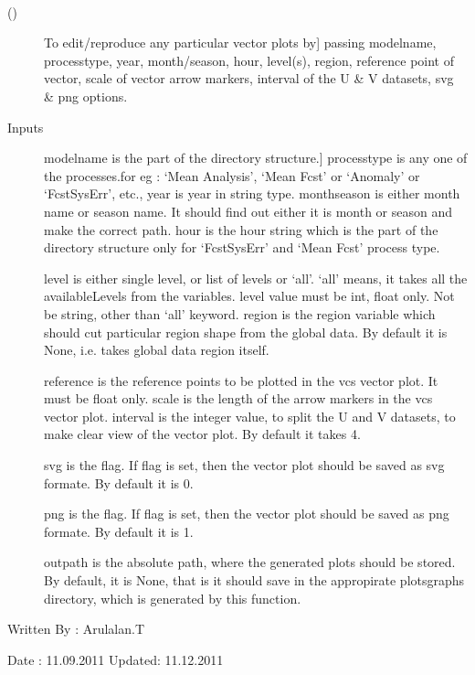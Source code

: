 \documentclass[letterpaper,10pt,english]{sphinxmanual}
\begin{document}
\begin{fulllineitems}
\label{diagnosis:generate_winds_plots.editVectorPlot}~\begin{description}
\item[{{\hyperref[diagnosis:generate_winds_plots.editVectorPlot]{}} ()}] \leavevmode{[}To edit/reproduce any particular vector plots by{]}
passing modelname, processtype, year, month/season, hour, level(s),
region, reference point of vector, scale of vector arrow markers,
interval of the U \& V datasets, svg \& png options.

\item[{Inputs}] \leavevmode{[}modelname is the part of the directory structure.{]}
processtype is any one of the processes.for eg : `Mean Analysis',
`Mean Fcst' or `Anomaly' or `FcstSysErr', etc.,
year is year in string type.
monthseason is either month name or season name. It should find
out either it is month or season and make the correct path.
hour is the hour string which is the part of the directory
structure only for `FcstSysErr' and `Mean Fcst' process type.

level is either single level, or list of levels or `all'.
`all' means, it takes all the availableLevels from the variables.
level value must be int, float only. Not be string, other than
`all' keyword.
region is the region variable which should cut particular region
shape from the global data. By default it is None, i.e. takes
global data region itself.

reference is the reference points to be plotted in the vcs
vector plot. It must be float only.
scale is the length of the arrow markers in the vcs vector plot.
interval is the integer value, to split the U and V datasets,
to make clear view of the vector plot. By default it takes 4.

svg is the flag. If flag is set, then the vector plot should be
saved as svg formate. By default it is 0.

png is the flag. If flag is set, then the vector plot should be
saved as png formate. By default it is 1.

outpath is the absolute path, where the generated plots should be
stored. By default, it is None, that is it should save in the
appropirate plotsgraphs directory, which is generated by this
function.

\end{description}

Written By : Arulalan.T

Date : 11.09.2011
Updated: 11.12.2011

\end{fulllineitems}
\end{document}
